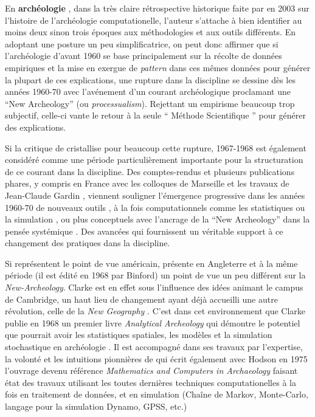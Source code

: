 En \textbf{archéologie} , dans la très claire rétrospective historique faite par \textcite{Lock2003} en 2003 sur l'histoire de l'archéologie computationelle, l'auteur s'attache à bien identifier au moins deux sinon trois époques aux méthodologies et aux outils différents. En adoptant une posture un peu simplificatrice, on peut donc affirmer que si l'archéologie d'avant 1960 se base principalement sur la récolte de données empiriques et la mise en exergue de \textit{pattern} dans ces mêmes données pour générer la plupart de ces explications, une rupture dans la discipline se dessine dès les années 1960-70 avec l'avénement d'un courant archéologique proclamant une \foreignquote{english}{New Archeology} (ou \textit{processualism}). Rejettant un empirisme beaucoup trop subjectif, celle-ci vante le retour à la seule \enquote{ Méthode Scientifique } pour générer des explications.

Si la critique de \textcite{Binford1962} cristallise pour beaucoup cette rupture, 1967-1968 est également considéré comme une période particulièrement importante pour la structuration de ce courant dans la discipline. Des comptes-rendus \autocites{Cowgill1967, Whallon1972} et plusieurs publications phares, y compris en France  avec les colloques de Marseille et les travaux de Jean-Claude Gardin \autocites{Gardin1971a, Dallas2015}, viennent souligner l'émergence progressive dans les années 1960-70 de nouveaux outils  , à la fois computationnels comme les statistiques  ou la simulation \autocite{Clarke1968}, ou plus conceptuels avec l'ancrage de la \foreignquote{english}{New Archeology} dans la pensée systémique \autocites{Clarke1968, Flannery1968, Binford1968} . Des avancées qui fournissent un véritable support à ce changement des pratiques dans la discipline.

Si \textcite{Binford1968,Binford1972} représentent le point de vue américain, \textcite{Clarke1968} présente en Angleterre et à la même période (il est édité en 1968 par Binford) un point de vue un peu différent sur la \textit{New-Archeology}. Clarke est en effet sous l'influence des idées animant le campus de Cambridge, un haut lieu de changement ayant déjà accueilli une autre révolution, celle de la \textit{New Geography} . C'est dans cet environnement que Clarke publie en 1968 un premier livre \textit{Analytical Archeology} qui démontre le potentiel que pourrait avoir les statistiques spatiales, les modèles et la simulation stochastique en archéologie \autocites{Clarke1968, Clarke1972, Gardin1970}. Il est accompagné dans ses travaux par l'expertise, la volonté et les intuitions pionnières  de \textcite{Doran1970} qui écrit également avec Hodson en 1975 l'ouvrage devenu référence \textit{Mathematics and Computers in Archaeology} \autocite{Doran1975} faisant état des travaux utilisant les toutes dernières techniques computationelles à la fois en traitement de données, et en simulation (Chaîne de Markov, Monte-Carlo, langage pour la simulation Dynamo, GPSS, etc.)

